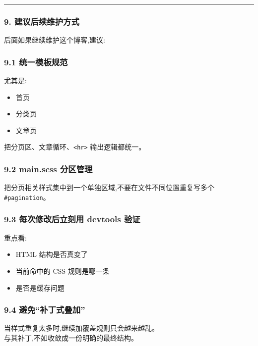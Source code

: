 \documentclass[lang=cn,scheme=chinese,color=blue,device=normal,toc=onecol,math=cm]{elegantbook}
\begin{document}
\medskip\hrule\medskip


\subsubsection{9. 建议后续维护方式}


后面如果继续维护这个博客,建议:\par


\subsubsection{9.1 统一模板规范}


尤其是:\par


\begin{itemize}
\item 首页
\item 分类页
\item 文章页
\end{itemize}


把分页区、文章循环、\texttt{<hr>} 输出逻辑都统一。\par


\subsubsection{9.2 main.scss 分区管理}


把分页相关样式集中到一个单独区域,不要在文件不同位置重复写多个 \texttt{\#pagination}。\par


\subsubsection{9.3 每次修改后立刻用 devtools 验证}


重点看:\par


\begin{itemize}
\item HTML 结构是否真变了
\item 当前命中的 CSS 规则是哪一条
\item 是否是缓存问题
\end{itemize}


\subsubsection{9.4 避免“补丁式叠加”}


当样式重复太多时,继续加覆盖规则只会越来越乱。\\ 与其补丁,不如收敛成一份明确的最终结构。\par
\end{document}

